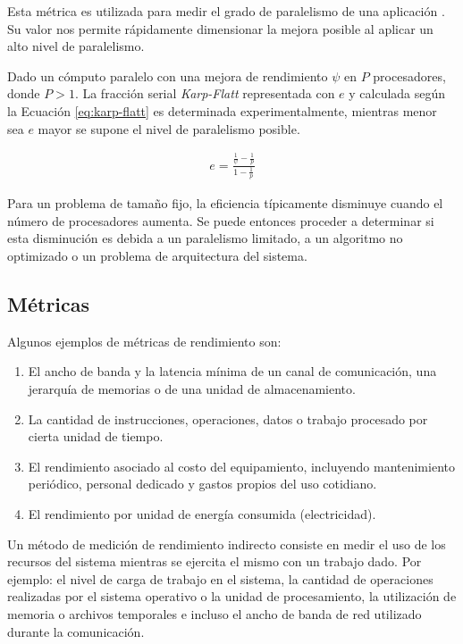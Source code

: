 \documentclass[a4paper]{report}
\begin{document}
Esta métrica es utilizada para medir el grado de paralelismo de una aplicación \cite{karp-flatt}. 
Su valor nos permite rápidamente dimensionar la mejora posible al aplicar un alto nivel de paralelismo.

\bigskip

Dado un cómputo paralelo con una mejora de rendimiento $ \psi $ en $ P $ procesadores, donde $ P > 1 $. 
La fracción serial {\it Karp-Flatt} representada con $ e $ y calculada según la Ecuación \ref{eq:karp-flatt} es determinada experimentalmente, 
mientras menor sea $ e $ mayor se supone el nivel de paralelismo posible.

\begin{eqnarray}
\label{eq:karp-flatt}
 e = \frac{\frac{1}{\psi} - \frac{1}{p}}{1 - \frac{1}{p}} 
\end{eqnarray}

Para un problema de tamaño fijo, la eficiencia típicamente disminuye cuando el número de procesadores aumenta. 
Se puede entonces proceder a determinar si esta disminución es debida a un paralelismo limitado, a un algoritmo no optimizado o un problema de arquitectura del sistema.

\subsection{Métricas}

Algunos ejemplos de métricas de rendimiento son:

\begin{enumerate}
\item El ancho de banda y la latencia mínima de un canal de comunicación,
  una jerarquía de memorias o de una unidad de almacenamiento.
\item La cantidad de instrucciones, operaciones, datos o trabajo procesado
  por cierta unidad de tiempo.
\item El rendimiento asociado al costo del equipamiento, incluyendo mantenimiento
 periódico, personal dedicado y gastos propios del uso cotidiano.
\item El rendimiento por unidad de energía consumida (electricidad).

\end{enumerate}

Un método de medición de rendimiento indirecto consiste en medir el uso de los recursos del sistema mientras se ejercita el mismo con un trabajo dado.
Por ejemplo: el nivel de carga de trabajo en el sistema, la cantidad de operaciones realizadas por el sistema operativo o la unidad de procesamiento, la utilización de memoria o
archivos temporales e incluso el ancho de banda de red utilizado durante la comunicación.
\end{document}

